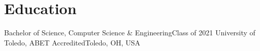 \section{Education}
\mySubHeadingListStart

  \mySubHeading
    {Bachelor of Science, Computer Science \& Engineering}{Class of 2021}
    {University of Toledo, ABET Accredited}{Toledo, OH, USA}
    \myItemListStart
    \myItemListEnd

\mySubHeadingListEnd
